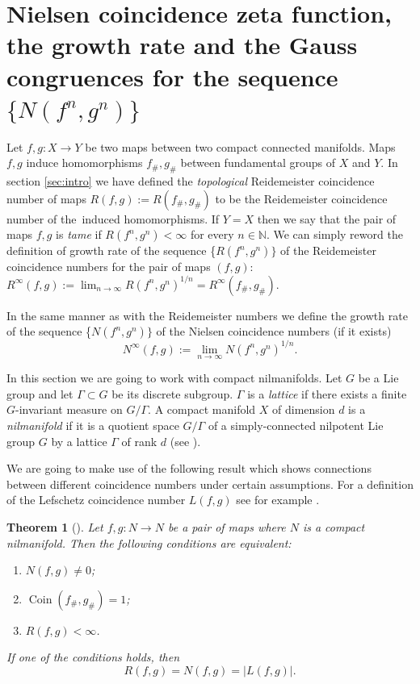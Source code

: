 \documentclass[12pt, a4paper]{amsart}
\def\G{{\Gamma}}
\def\Coin{\operatorname{Coin}}
\newtheorem{theorem}{Theorem}
\def\N{{\mathbb N}}
\begin{document}
\bigskip
\section{Nielsen coincidence zeta function, the growth rate  and the Gauss congruences for  the sequence  $\{N(f^n, g^n)\}$}\label{sec:coincidence-nielsen}

Let $f, g: X \to Y$ be two maps between two compact connected manifolds.
Maps $f,g$ induce homomorphisms $f_\#, g_\#$ between fundamental groups of $X$ and $Y$.
In section \ref{sec:intro} we have defined the \emph{topological} Reidemeister coincidence number of maps $R(f,g) := R(f_\#,g_\#)$
to be the Reidemeister coincidence number of the~induced homomorphisms.
If $Y=X$ then we say that the pair of maps $f,g$ is \emph{tame} if
$R(f^n, g^n) < \infty$ for every $n \in \N$.
We can simply reword the definition of growth rate of the sequence \{$R(f^n, g^n)\}$
of the Reidemeister coincidence numbers
for the pair of maps $(f,g)$: $R^\infty(f,g) := \lim_{n \to \infty} R(f^n, g^n)^{1/n} = R^\infty(f_\#,g_\#)$.

In the same manner as with the Reidemeister numbers we define the growth rate of the sequence
\{$N(f^n, g^n)\}$  of the Nielsen coincidence numbers
(if it exists)
\[
  N^\infty(f,g) := \lim_{n \to \infty}  N(f^n, g^n)^{1/n}.
\]

In this section we are going to work with compact nilmanifolds.
Let $G$ be a Lie group and let $\G \subset G$ be its discrete subgroup.
$\G$ is a \emph{lattice} if there exists a finite $G$-invariant measure on $G/\G$.
A compact manifold $X$ of dimension $d$ is a \emph{nilmanifold} if it is a quotient space $G/\G$
of a simply-connected nilpotent Lie group $G$ by a lattice $\G$ of rank $d$ (see \cite[Definition 6.2.5]{JezMar}).

We are going to make use of the following result which shows connections between different coincidence numbers
under certain assumptions.
For a definition of the Lefschetz coincidence number $L(f,g)$ see for example \cite{Vick}.

\begin{theorem}[]\label{thm:nielsen-reidemeister}
  Let $f,g:N \to N$ be a pair of maps where $N$ is a compact nilmanifold.
  Then the following conditions are equivalent:
  \begin{enumerate}
    \item[(i)] $N(f,g) \neq 0$;
    \item[(ii)] $\Coin(f_\#, g_\#) = 1$;
    \item[(iii)] $R(f,g) < \infty$.
  \end{enumerate}
  If one of the conditions holds, then
  \[
    R(f,g) = N(f,g) = |L(f,g)|.
  \]
\end{theorem}
\end{document}
